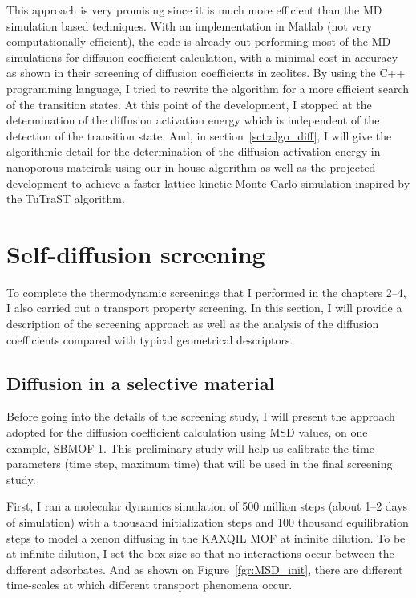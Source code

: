 \documentclass[main]{subfiles}
\begin{document}
This approach is very promising since it is much more efficient than the MD simulation based techniques. With an implementation in Matlab (not very computationally efficient), the code is already out-performing most of the MD simulations for diffsuion coefficient calculation, with a minimal cost in accuracy as shown in their screening of diffusion coefficients in zeolites. By using the C++ programming language, I tried to rewrite the algorithm for a more efficient search of the transition states. At this point of the development, I stopped at the determination of the diffusion activation energy which is independent of the detection of the transition state. And, in section~\ref{sct:algo_diff}, I will give the algorithmic detail for the determination of the diffusion activation energy in nanoporous mateirals using our in-house algorithm as well as the projected development to achieve a faster lattice kinetic Monte Carlo simulation inspired by the TuTraST algorithm.


\section{Self-diffusion screening}\label{sct:md_screening}

To complete the thermodynamic screenings that I performed in the chapters 2--4, I also carried out a transport property screening. In this section, I will provide a description of the screening approach as well as the analysis of the diffusion coefficients compared with typical geometrical descriptors.

\subsection{Diffusion in a selective material}

Before going into the details of the screening study, I will present the approach adopted for the diffusion coefficient calculation using MSD values, on one example, SBMOF-1\autocite{Banerjee_2016}. This preliminary study will help us calibrate the time parameters (time step, maximum time) that will be used in the final screening study.

First, I ran a molecular dynamics simulation of 500 million steps (about 1--2 days of simulation) with a thousand initialization steps and 100 thousand equilibration steps to model a xenon diffusing in the KAXQIL\autocite{Banerjee2012} MOF at infinite dilution. To be at infinite dilution, I set the box size so that no interactions occur between the different adsorbates. And as shown on Figure~\ref{fgr:MSD_init}, there are different time-scales at which different transport phenomena occur. 
\end{document}
